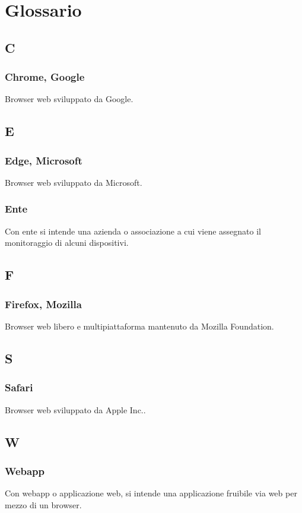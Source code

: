 \appendix
{}

\section{Glossario}
\subsection{C}
\subsubsection*{Chrome, Google}
Browser web sviluppato da Google.
\subsection{E}
\subsubsection*{Edge, Microsoft}
Browser web sviluppato da Microsoft.
\subsubsection*{Ente}
Con ente si intende una azienda o associazione a cui viene assegnato il monitoraggio di alcuni dispositivi.
\subsection{F}
\subsubsection*{Firefox, Mozilla}
Browser web libero e multipiattaforma mantenuto da Mozilla Foundation.
\subsection{S}
\subsubsection*{Safari}
Browser web sviluppato da Apple Inc.. 
\subsection{W}
\subsubsection*{Webapp}
Con webapp o applicazione web, si intende una applicazione fruibile via web per mezzo di un browser.